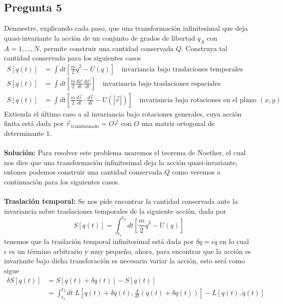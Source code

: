 \documentclass[../main_ej.tex]{subfiles}
\begin{document}
\subsection{Pregunta 5}
Demuestre, explicando cada paso, que una transformación infinitesimal que deja quasi-invariante la acción de un conjunto de grados de libertad $q_A$ con $A=1,\dots ,N$, permite construir una cantidad conservada $Q$. Construya tal cantidad conservada para los siguientes casos
\begin{align*}
  S[q(t)] & = \int dt \left[\frac{m}{2}{\dot{q}}^2 - U(q) \right] \quad \text{invariancia bajo traslaciones temporales} \\ 
  S[q(t)] & = \int dt \left[ \frac{m}{2}\frac{dx^i}{dt}\frac{dx^i}{dt}\right] \quad \text{invariancia bajo traslaciones espaciales} \\
  S[q(t)] & = \int dt \left[  \frac{m}{2}\frac{d\vec{r}}{dt}\cdot \frac{d\vec{r}}{dt}-U(|\vec{r}|)\right] \quad \text{invariancia bajo rotaciones en el plano }(x,y)
\end{align*}
Extienda el último caso a al invariancia bajo rotaciones generales, cuya acción finita está dada por $\vec{r}_{\text{transformado}}=O\vec{r}$ con $O$ una matriz ortogonal de determinante $1$. \\
\\
\textbf{Solución:}
Para resolver este problema usaremos el  teorema de Noether, el cual nos dice que una transformación infinitesimal deja la acción quasi-invariante, entones podemos construir una cantidad conservada $Q$ como veremos a continuación para los siguientes casos. \\
\\
\textbf{Traslación temporal:} Se nos pide encontrar la cantidad conservada ante la invariancia sobre traslaciones temporales de la siguiente acción, dada por
\begin{equation*}
  S[q(t)] = \int_{t_1}^{t_2} dt \left[ \frac{m}{2}\dot{q}^2 - U(q) \right]
\end{equation*}
tenemos que la traslación temporal infinitesimal está dada por $\delta q = \epsilon \dot{q}$ en lo cual $\epsilon$ es un término arbitrario y muy pequeño, ahora, para encontrar que la acción es invariante bajo dicha transforación es necesario variar la acción, esto será como sigue
\begin{align*}
  \delta S[q(t)]  & = S[q(t)+\delta q(t)] - S[q(t)] \\
  & = \int_{t_1}^{t_2}dt \; L[q(t)+\delta q(t), \frac{d}{dt}(q(t)+\delta q(t))] - L[q(t),\dot{q}(t)]
\end{align*}
\end{document}
